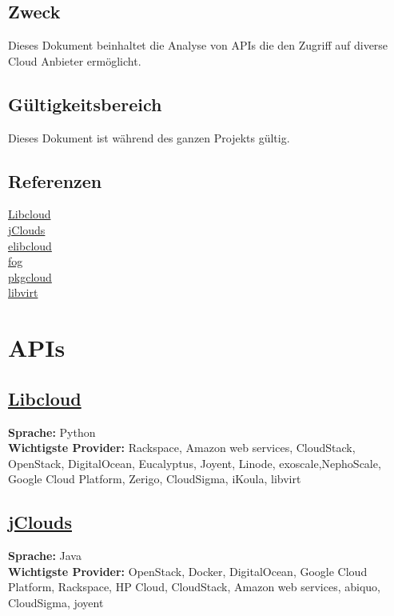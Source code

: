 \documentclass[11pt]{scrartcl}
\begin{document}
\subsection{Zweck}
Dieses Dokument beinhaltet die Analyse von APIs die den Zugriff auf diverse Cloud Anbieter ermöglicht.
\subsection{Gültigkeitsbereich}
Dieses Dokument ist während des ganzen Projekts gültig.

\subsection{Referenzen}
\href{https://libcloud.apache.org}{Libcloud}\\
\href{https://jclouds.apache.org}{jClouds}\\
\href{https://github.com/esl/elibcloud}{elibcloud}\\
\href{https://github.com/fog/fog/blob/master/lib/fog/openstack/docs/getting_started.md}{fog}\\
\href{https://github.com/pkgcloud/pkgcloud}{pkgcloud}\\
\href{http://http://libvirt.org/}{libvirt}\\

\newpage

\section{APIs}
\subsection{\href{https://libcloud.apache.org}{Libcloud}}
\textbf{Sprache: }Python\\
\textbf{Wichtigste Provider: }Rackspace, Amazon web services, CloudStack, OpenStack, DigitalOcean, Eucalyptus, Joyent, Linode, exoscale,NephoScale, Google Cloud Platform, Zerigo, CloudSigma, iKoula, libvirt\\

\subsection{\href{https://jclouds.apache.org}{jClouds}}
\textbf{Sprache: }Java\\
\textbf{Wichtigste Provider: }OpenStack, Docker, DigitalOcean, Google Cloud Platform, 
Rackspace, HP Cloud, CloudStack, Amazon web services, abiquo, CloudSigma, joyent\\
\end{document}
